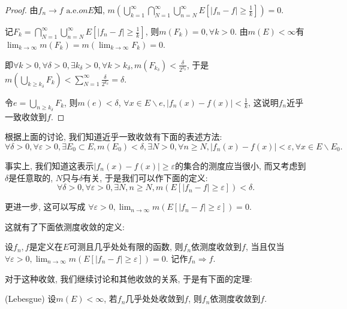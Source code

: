 \documentclass[theorem=false,mathfont=none,openany,sub3section]{easybook}
\begin{document}
\begin{proof}
  由$f_n \rightarrow f \text{ a.e.} on E$知, $m\left(\bigcup_{k=1}^{\infty}\bigcap_{N=1}^{\infty}\bigcup_{n=N}^{\infty}E\left[|f_n-f|\geqslant \frac{1}{k}\right]\right)=0$.\par
  记$F_k=\bigcap_{N=1}^{\infty}\bigcup_{n=N}^{\infty}E\left[|f_n-f|\geqslant \frac{1}{k}\right]$, 则$m(F_k)=0, \forall k >0$. 由$m(E)<\infty$有$\lim_{k\to \infty}m(F_k) = m(\lim_{k\to \infty}F_k)=0$.\par
  即$\forall k > 0, \forall \delta >0, \exists k_{\delta}>0, \forall k>k_{\delta}, m(F_{k_{\delta}})<\frac{\delta}{2^{k_{\delta}}}$, 于是$m\left(\bigcup_{k\geqslant k_{\delta}}F_k\right)<\sum_{N=1}^{\infty}\frac{\delta}{2^{k_{\delta}}}=\delta$.\par
  令$e=\bigcup_{n\geqslant k_{\delta}}F_k$, 则$m(e)<\delta$, $\forall x\in E\backslash e, |f_n(x)-f(x)|<\frac{1}{k}$, 这说明$f_n$近乎一致收敛到$f$.\par 
\end{proof}

根据上面的讨论, 我们知道近乎一致收敛有下面的表述方法:
$$\forall \delta >0, \forall \varepsilon >0, \exists E_0\subset E, m(E_0)<\delta, \exists N>0, \forall n\geqslant N, |f_n(x)-f(x)|<\varepsilon, \forall x\in E\backslash E_0.$$

事实上, 我们知道这表示$|f_n(x)-f(x)|\geqslant \varepsilon$的集合的测度应当很小, 而又考虑到$\delta$是任意取的, $N$只与$\delta$有关, 于是我们可以作下面的定义:
$$\forall \delta >0, \forall \varepsilon >0, \exists N, n\geqslant N, m\left(E\left[|f_n-f|\geqslant \varepsilon\right]\right)<\delta.$$

更进一步, 这可以写成
$\forall \varepsilon >0, \lim_{n \to \infty}m\left(E\left[|f_n-f|\geqslant \varepsilon\right]\right) = 0.$

这就有了下面依测度收敛的定义:\par
\begin{definition}
  设$f_n,f$是定义在$E$可测且几乎处处有限的函数, 则$f_n$依测度收敛到$f$, 当且仅当$\forall \varepsilon >0, \lim_{n \to \infty}m\left(E\left[|f_n-f|\geqslant \varepsilon\right]\right) = 0$. 记作$f_n\Rightarrow f$.
\end{definition}

对于这种收敛, 我们继续讨论和其他收敛的关系, 于是有下面的定理:\par

\begin{theorem}
  (Lebesgue) 设$m(E)<\infty$, 若$f_n$几乎处处收敛到$f$, 则$f_n$依测度收敛到$f$.\par
\end{theorem}
\end{document}
